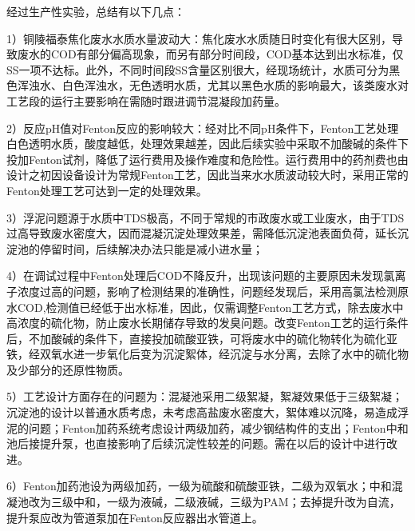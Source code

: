 经过生产性实验，总结有以下几点：\par
1）铜陵福泰焦化废水水质水量波动大：焦化废水水质随日时变化有很大区别，导致废水的COD有部分偏高现象，而另有部分时间段，COD基本达到出水标准，仅SS一项不达标。此外，不同时间段SS含量区别很大，经现场统计，水质可分为黑色浑浊水、白色浑浊水，无色透明水质，尤其以黑色水质的影响最大，该类废水对工艺段的运行主要影响在需随时跟进调节混凝段加药量。\par
2）反应pH值对Fenton反应的影响较大：经对比不同pH条件下，Fenton工艺处理白色透明水质，酸度越低，处理效果越差，因此后续实验中采取不加酸碱的条件下投加Fenton试剂，降低了运行费用及操作难度和危险性。运行费用中的药剂费也由设计之初因设备设计为常规Fenton工艺，因此当来水水质波动较大时，采用正常的Fenton处理工艺可达到一定的处理效果。\par
3）浮泥问题源于水质中TDS极高，不同于常规的市政废水或工业废水，由于TDS过高导致废水密度大，因而混凝沉淀处理效果差，需降低沉淀池表面负荷，延长沉淀池的停留时间，后续解决办法只能是减小进水量；\par
4）在调试过程中Fenton处理后COD不降反升，出现该问题的主要原因未发现氯离子浓度过高的问题，影响了检测结果的准确性，问题经发现后，采用高氯法检测原水COD,检测值已经低于出水标准，因此，仅需调整Fenton工艺方式，除去废水中高浓度的硫化物，防止废水长期储存导致的发臭问题。改变Fenton工艺的运行条件后，不加酸碱的条件下，直接投加硫酸亚铁，可将废水中的硫化物转化为硫化亚铁，经双氧水进一步氧化后变为沉淀絮体，经沉淀与水分离，去除了水中的硫化物及少部分的还原性物质。\par
5）工艺设计方面存在的问题为：混凝池采用二级絮凝，絮凝效果低于三级絮凝；沉淀池的设计以普通水质考虑，未考虑高盐废水密度大，絮体难以沉降，易造成浮泥的问题；Fenton加药系统考虑设计两级加药，减少钢结构件的支出；Fenton中和池后接提升泵，也直接影响了后续沉淀性较差的问题。需在以后的设计中进行改进。\par
6）Fenton加药池设为两级加药，一级为硫酸和硫酸亚铁，二级为双氧水；中和混凝池改为三级中和，一级为液碱，二级液碱，三级为PAM；去掉提升改为自流，提升泵应改为管道泵加在Fenton反应器出水管道上。\par
